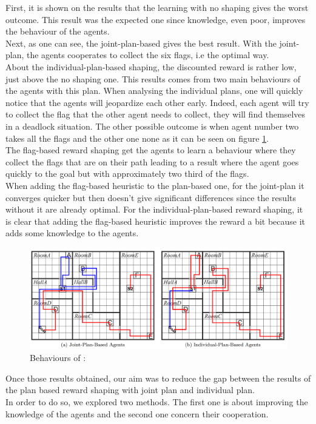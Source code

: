 \documentclass[letterpaper]{article}
\begin{document}
First, it is shown on the results that the learning with no shaping gives the worst outcome. This result was the expected one since knowledge, even poor, improves the behaviour of the agents.\\
Next, as one can see, the joint-plan-based gives the best result. With the joint-plan, the agents cooperates to collect the six flags, i.e the optimal way.\\
About the individual-plan-based shaping, the discounted reward is rather low, just above the no shaping one. This results comes from two main behaviours of the agents with this plan. When analysing the individual plans, one will quickly notice that the agents will jeopardize each other early. Indeed, each agent will try to collect the flag that the other agent needs to collect, they will find themselves in a deadlock situation. The other possible outcome is when agent number two takes all the flags and the other one none as it can be seen on figure \ref{fig:behave}.\\
The flag-based reward shaping get the agents to learn a behaviour where they collect the flags that are on their path leading to a result where the agent goes quickly to the goal but with approximately two third of the flags.\\
When adding the flag-based heuristic to the plan-based one, for the joint-plan it converges quicker but then doesn't give significant differences since the results without it are already optimal. For the individual-plan-based reward shaping, it is clear that adding the flag-based heuristic improves the reward a bit because it adds some knowledge to the agents.\\

\begin{figure}[h!]
  \includegraphics[width=\linewidth]{img/behavious.png}
  \caption{Behaviours of :}
  \label{fig:behave}
\end{figure}

Once those results obtained, our aim was to reduce the gap between the results of the plan based reward shaping with joint plan and individual plan.\\
In order to do so, we explored two methods. The first one is about improving the knowledge of the agents and the second one concern their cooperation.
\end{document}
